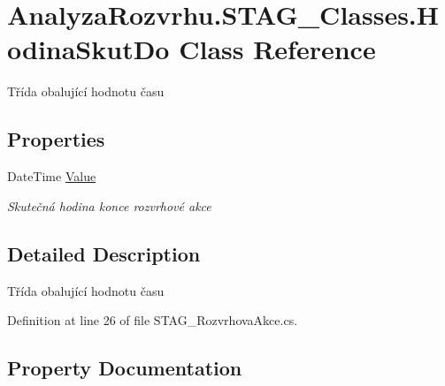 \hypertarget{class_analyza_rozvrhu_1_1_s_t_a_g___classes_1_1_hodina_skut_do}{}\section{Analyza\+Rozvrhu.\+S\+T\+A\+G\+\_\+\+Classes.\+Hodina\+Skut\+Do Class Reference}
\label{class_analyza_rozvrhu_1_1_s_t_a_g___classes_1_1_hodina_skut_do}


Třída obalující hodnotu času  


\subsection*{Properties}
\begin{DoxyCompactItemize}
\item 
Date\+Time \hyperlink{class_analyza_rozvrhu_1_1_s_t_a_g___classes_1_1_hodina_skut_do_a1f83fac6a361fcc0fedf96b2ac53e7d2}{Value}
\begin{DoxyCompactList}\small\item\em Skutečná hodina konce rozvrhové akce \end{DoxyCompactList}\end{DoxyCompactItemize}


\subsection{Detailed Description}
Třída obalující hodnotu času 



Definition at line 26 of file S\+T\+A\+G\+\_\+\+Rozvrhova\+Akce.\+cs.



\subsection{Property Documentation}
\mbox{\label{class_analyza_rozvrhu_1_1_s_t_a_g___classes_1_1_hodina_skut_do_a1f83fac6a361fcc0fedf96b2ac53e7d2}} 
